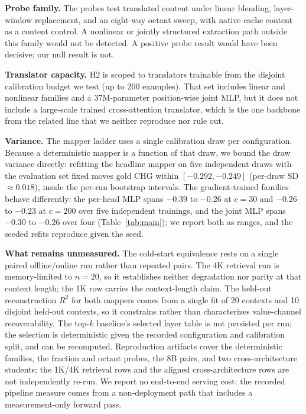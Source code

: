 \documentclass[10pt]{article}
\begin{document}
\textbf{Probe family.} The probes test translated content under linear
blending, layer-window replacement, and an eight-way octant sweep, with native
cache content as a content control. A nonlinear or jointly structured
extraction path outside this family would not be detected. A positive probe
result would have been decisive; our null result is not.

\textbf{Translator capacity.} H2 is scoped to translators trainable from the
disjoint calibration budget we test (up to $200$ examples). That set includes
linear and nonlinear families and a $37$M-parameter position-wise joint MLP,
but it does not
include a large-scale trained cross-attention translator, which is the one
backbone from the related line that we neither reproduce nor rule out.

\textbf{Variance.} The mapper ladder uses a single calibration draw per
configuration. Because a deterministic mapper is a function of that draw, we
bound the draw variance directly: refitting the headline mapper on five
independent draws with the evaluation set fixed moves gold CHG within
$[-0.292, -0.249]$ (per-draw SD $\approx 0.018$), inside the per-run bootstrap
intervals. The gradient-trained families behave differently: the per-head MLP
spans $-0.39$ to $-0.26$ at $c{=}30$ and $-0.26$ to $-0.23$ at $c{=}200$ over
five independent trainings, and the joint MLP spans $-0.30$ to $-0.26$ over
four (Table~\ref{tab:main}); we report both as ranges, and the seeded refits
reproduce given the seed.

\textbf{What remains unmeasured.} The cold-start equivalence rests on a single
paired offline/online run rather than repeated pairs. The 4K retrieval run is
memory-limited to
$n{=}20$, so it establishes neither degradation nor parity at that context
length; the 1K row carries the context-length claim. The held-out reconstruction
$R^2$ for both mappers comes from a single fit of 20 contexts and 10 disjoint
held-out contexts, so it constrains rather than characterizes value-channel
recoverability. The top-$k$ baseline's selected layer table is not persisted per
run; the selection is deterministic given the recorded configuration and
calibration split, and can be recomputed. Reproduction artifacts cover the
deterministic families, the fraction and octant probes, the 8B pairs, and two
cross-architecture students; the 1K/4K retrieval rows and the aligned
cross-architecture rows are not independently re-run. We report no end-to-end
serving cost: the recorded pipeline measure comes from a non-deployment path
that includes a measurement-only forward pass.
\end{document}
